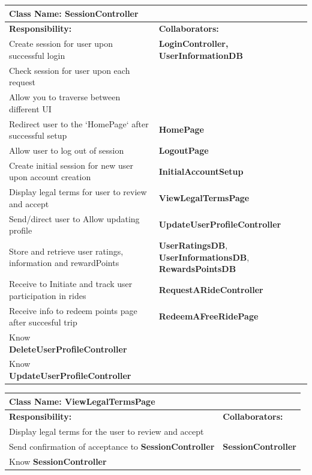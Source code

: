\documentclass[]{article}
\begin{document}
   \begin{table}[H]
    \centering
    \begin{tabular}{|p{5cm}|p{5cm}|}
    \hline 
     \multicolumn{2}{|l|}{\textbf{Class Name:} SessionController} \\
    \hline
    \textbf{Responsibility:} & \textbf{Collaborators:} \\
    \hline
    Create session for user upon successful login & \textbf{LoginController, UserInformationDB} \\
    \hline
    Check session for user upon each request &  \phantom{} \\
    \hline
    Allow you to traverse between different UI &  \phantom{} \\
    \hline
    Redirect user to the `HomePage` after successful setup & \textbf{HomePage} \\
    \hline
    Allow user to log out of session & \textbf{LogoutPage} \\
    \hline
    Create initial session for new user upon account creation & \textbf{InitialAccountSetup} \\
    \hline
    Display legal terms for user to review and accept & \textbf{ViewLegalTermsPage} \\
    \hline
    Send/direct user to Allow updating profile & \textbf{UpdateUserProfileController} \\
    \hline
    Store and retrieve user ratings, information and rewardPoints & \textbf{UserRatingsDB}, \textbf{UserInformationsDB}, \textbf{RewardsPointsDB}\\
    \hline
    Receive to Initiate and track user participation in rides & \textbf{RequestARideController} \\
    \hline
    Receive info to redeem points page after succesful trip & \textbf{RedeemAFreeRidePage} \\
    \hline
    Know \textbf{DeleteUserProfileController} & \phantom{} \\
    \hline
    Know \textbf{UpdateUserProfileController} & \phantom{} \\
    \hline

    \end{tabular}
\end{table}

\begin{table}[H]
    \centering
    \begin{tabular}{|p{5cm}|p{5cm}|}
    \hline 
     \multicolumn{2}{|l|}{\textbf{Class Name:} ViewLegalTermsPage} \\
    \hline
    \textbf{Responsibility:} & \textbf{Collaborators:} \\
    \hline
    Display legal terms for the user to review and accept & \phantom{} \\
    \hline
    Send confirmation of acceptance to \textbf{SessionController} & \textbf{SessionController} \\
    \hline
    Know \textbf{SessionController} & \phantom{} \\
        \hline
    
    \end{tabular}
\end{table}
\end{document}
